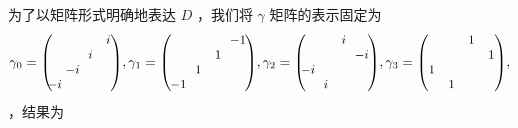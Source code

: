 \documentclass{siamltex}
\begin{document}
为了以矩阵形式明确地表达    $D$   ，我们将    $\gamma$    矩阵的表示固定为
\begin{equation*}\label{eq:chiralgamma}
  \gamma_{0} = \small{
    \begin{pmatrix}
      \phantom{i}                            & \phantom{i}                            & \phantom{i} & i           \\
                                             &                                        & i           & \phantom{i} \\
                                             & \makebox[0cm][c]{        $-i$        } &             &             \\
      \makebox[0cm][c]{        $-i$        } &                                        &             &
    \end{pmatrix}},
  \gamma_{1} = \small{ \left( \;
    \begin{matrix}
      \phantom{1}                            & \phantom{1} & \phantom{1} & \makebox[0cm][c]{        $-1$        } \\
                                             &             & 1           & \phantom{1}                            \\
                                             & 1           &             &                                        \\
      \makebox[0cm][c]{        $-1$        } &             &             &
    \end{matrix}
    \; \right)},
  \gamma_{2} = \small{ \left(
    \begin{matrix}
      \phantom{i}                            & \phantom{i} & i           & \phantom{i}                            \\
                                             &             & \phantom{i} & \makebox[0cm][c]{        $-i$        } \\
      \makebox[0cm][c]{        $-i$        } &             &             &                                        \\
                                             & i           &             &
    \end{matrix}
    \; \right)},
  \gamma_{3} = \small{
    \begin{pmatrix}
      \phantom{1} & \phantom{1} & 1          & \phantom{1} \\
                  &             & \phantom{} & 1           \\
      1           &             &            &             \\
                  & 1           &            &
    \end{pmatrix}
  },
\end{equation*}    ，结果为
\end{document}
